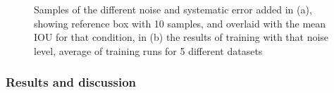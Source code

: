 \begin{figure}[ht!]
\begin{subfigure}[t]{0.5\linewidth}
  \caption{}
\end{subfigure}
  \caption{ Samples of the different noise and systematic error added in (a), showing reference box with 10 samples, and overlaid with the mean \gls{IOU} for that condition, in (b) the results of training with that noise level, average of training runs for 5 different datasets }  
  \label{fig:noisy_training}
\end{figure}

\subsubsection{Results and discussion}

\newcommand{\STAB}[1]{\begin{tabular}{@{}c@{}}#1\end{tabular}}


